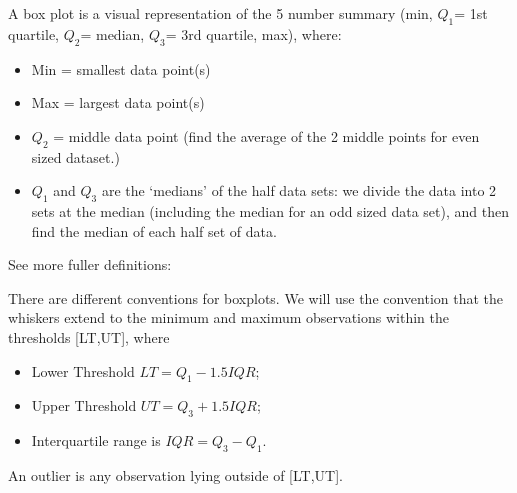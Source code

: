 \documentclass[t,xcolor=pdftex,dvipsnames,table]{beamer}
\begin{document}
\begin{frame}[fragile]{}
\vspace{.5cm}
A box plot is a visual representation of the 5 number summary
(min, $Q_1$= 1st quartile, $Q_2$= median, $Q_3$= 3rd quartile, max), where:

\begin{itemize}
\item Min = smallest data point(s) \\
\item Max = largest data point(s) \\
\item $Q_2$ = middle data point (find the average of the 2 middle points for even sized dataset.) \\
\item $Q_{1}$ and $Q_{3}$ are the `medians' of the half data sets: we divide the data into 2 sets at the median (including the median for an odd sized data set), and then find the median of each half set of data.
\end{itemize}

See more fuller definitions:  \hyperlink{Quartiles}{} 

\end{frame}


\begin{frame}[fragile]{}

There are different conventions for boxplots. We will use the convention that the whiskers extend to the minimum and maximum observations within the thresholds [LT,UT], where 
\begin{itemize}
\item Lower Threshold $LT=Q_1-1.5IQR$;
\item Upper Threshold $UT=Q_3+ 1.5IQR$;
\item Interquartile range is $IQR=Q_3-Q_1$.
\end{itemize}

\vspace{.5cm}
An outlier is any observation lying outside of [LT,UT].
\end{frame}
\end{document}
